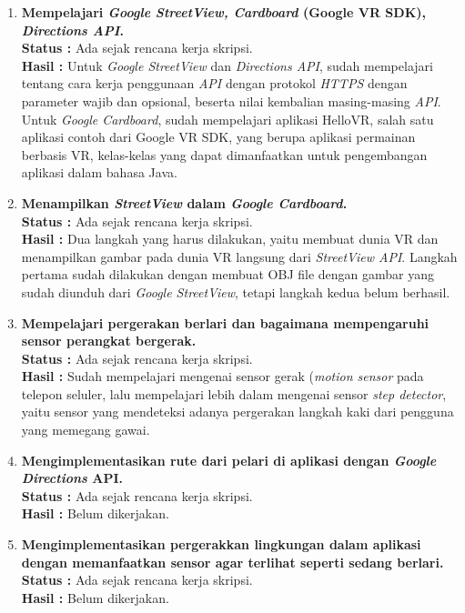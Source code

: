 \documentclass[a4paper,twoside]{article}
\begin{document}
	\begin{enumerate}
		\item \textbf{Mempelajari {\it Google StreetView, Cardboard} (Google VR SDK), {\it Directions API}.}\\
		{\bf Status :} Ada sejak rencana kerja skripsi.\\
		{\bf Hasil : } Untuk \textit{Google StreetView} dan \textit{Directions API}, sudah mempelajari tentang cara kerja penggunaan \textit{API} dengan protokol \textit{HTTPS} dengan parameter wajib dan opsional, beserta nilai kembalian masing-masing \textit{API}. Untuk \textit{Google Cardboard}, sudah mempelajari aplikasi HelloVR, salah satu aplikasi contoh dari Google VR SDK, yang berupa aplikasi permainan berbasis VR, kelas-kelas yang dapat dimanfaatkan untuk pengembangan aplikasi dalam bahasa Java.
		
		\item \textbf{Menampilkan {\it StreetView} dalam {\it Google Cardboard}.}\\
		{\bf Status :} Ada sejak rencana kerja skripsi.\\
		{\bf Hasil :} Dua langkah yang harus dilakukan, yaitu membuat dunia VR dan menampilkan gambar pada dunia VR langsung dari \textit{StreetView API}. Langkah pertama sudah dilakukan dengan membuat OBJ file dengan gambar yang sudah diunduh dari \textit{Google StreetView}, tetapi langkah kedua belum berhasil.

		\item \textbf{Mempelajari pergerakan berlari dan bagaimana mempengaruhi sensor perangkat bergerak.}\\
		{\bf Status :} Ada sejak rencana kerja skripsi.\\
		{\bf Hasil :} Sudah mempelajari mengenai sensor gerak (\textit{motion sensor} pada telepon seluler, lalu mempelajari lebih dalam mengenai sensor \textit{step detector}, yaitu sensor yang mendeteksi adanya pergerakan langkah kaki dari pengguna yang memegang gawai. 
		
		\item \textbf{Mengimplementasikan rute dari pelari di aplikasi dengan {\it Google Directions} API.}\\
		{\bf Status :} Ada sejak rencana kerja skripsi.\\
		{\bf Hasil :} Belum dikerjakan.

		\item \textbf{Mengimplementasikan pergerakkan lingkungan dalam aplikasi dengan memanfaatkan sensor agar terlihat seperti sedang berlari.}\\
		{\bf Status :} Ada sejak rencana kerja skripsi.\\
		{\bf Hasil :} Belum dikerjakan.


\end{enumerate}
\end{document}
